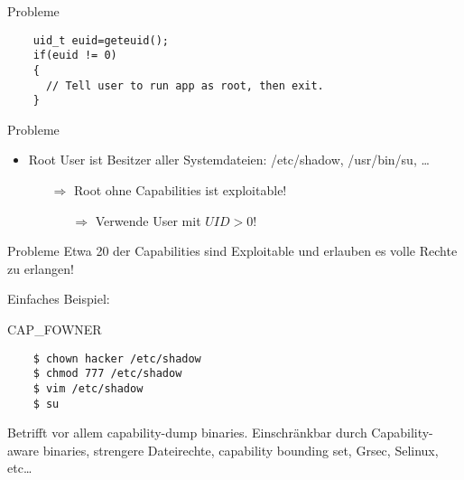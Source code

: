 \documentclass[usenames,dvipsnames,10pt]{beamer}
\begin{document}
\begin{frame}[fragile]{Probleme}
	\begin{listing}[H]
	\captionsetup{labelformat=empty}
	
	\begin{verbatim}
	uid_t euid=geteuid();
	if(euid != 0)
	{
	  // Tell user to run app as root, then exit.
	}

	\end{verbatim}
	\end{listing}
\end{frame}


\begin{frame}[<+->]{Probleme}
\begin{itemize}
	\item Root User ist Besitzer aller Systemdateien: /etc/shadow, /usr/bin/su, …
	\begin{itemize}
	\item[$\Rightarrow$] Root ohne Capabilities ist exploitable!
	\begin{itemize}
			\item[$\Rightarrow$] Verwende User mit $UID > 0$!
	\end{itemize}
	\end{itemize}
\end{itemize}
\end{frame}


\begin{frame}[fragile]{Probleme}
	Etwa 20 der Capabilities sind Exploitable und erlauben es volle Rechte zu erlangen!\pause
	
	Einfaches Beispiel:
	
	CAP\_FOWNER
	
	\begin{verbatim}
	$ chown hacker /etc/shadow
	$ chmod 777 /etc/shadow
	$ vim /etc/shadow
	$ su
	\end{verbatim}
	\pause
	Betrifft vor allem capability-dump binaries.
	\pause
	Einschränkbar durch Capability-aware binaries, strengere Dateirechte, capability bounding set, Grsec, Selinux, etc…
\end{frame}
\end{document}
